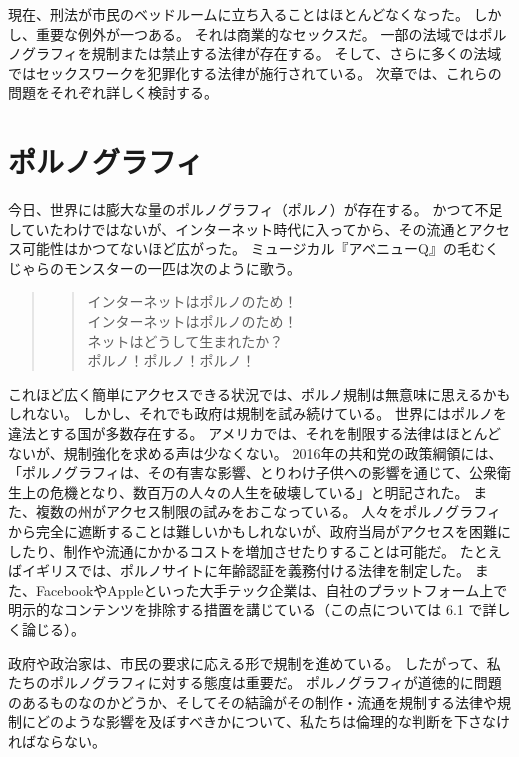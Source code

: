 \documentclass[paper=a4,book,openany]{jlreq}
\begin{document}
現在、刑法が市民のベッドルームに立ち入ることはほとんどなくなった。
しかし、重要な例外が一つある。
それは商業的なセックスだ。
一部の法域ではポルノグラフィを規制または禁止する法律が存在する。
そして、さらに多くの法域ではセックスワークを犯罪化する法律が施行されている。
次章では、これらの問題をそれぞれ詳しく検討する。

\section{ポルノグラフィ}

今日、世界には膨大な量のポルノグラフィ（ポルノ）が存在する。
かつて不足していたわけではないが、インターネット時代に入ってから、その流通とアクセス可能性はかつてないほど広がった。
ミュージカル『アベニューQ』の毛むくじゃらのモンスターの一匹は次のように歌う\citep{dabruzzo03:_inter_is_porn}。

\begin{quote}

  \begin{verse}
    インターネットはポルノのため！\\インターネットはポルノのため！\\ネットはどうして生まれたか？\\ポルノ！ポルノ！ポルノ！
  \end{verse}
\end{quote}

これほど広く簡単にアクセスできる状況では、ポルノ規制は無意味に思えるかもしれない。
しかし、それでも政府は規制を試み続けている。
世界にはポルノを違法とする国が多数存在する。
アメリカでは、それを制限する法律はほとんどないが、規制強化を求める声は少なくない。
2016年の共和党の政策綱領には、「ポルノグラフィは、その有害な影響、とりわけ子供への影響を通じて、公衆衛生上の危機となり、数百万の人々の人生を破壊している」と明記された\citep{obrien16:_south_carol_lawmak_propos_pornog}。
また、複数の州がアクセス制限の試みをおこなっている\citep{brown17:_hypoc_logic_behin_repub_plans}。
人々をポルノグラフィから完全に遮断することは難しいかもしれないが、政府当局がアクセスを困難にしたり、制作や流通にかかるコストを増加させたりすることは可能だ。
たとえばイギリスでは、ポルノサイトに年齢認証を義務付ける法律を制定した。
また、FacebookやAppleといった大手テック企業は、自社のプラットフォーム上で明示的なコンテンツを排除する措置を講じている（この点については 6.1 で詳しく論じる）。

政府や政治家は、市民の要求に応える形で規制を進めている。
したがって、私たちのポルノグラフィに対する態度は重要だ。
ポルノグラフィが道徳的に問題のあるものなのかどうか、そしてその結論がその制作・流通を規制する法律や規制にどのような影響を及ぼすべきかについて、私たちは倫理的な判断を下さなければならない。
\end{document}
